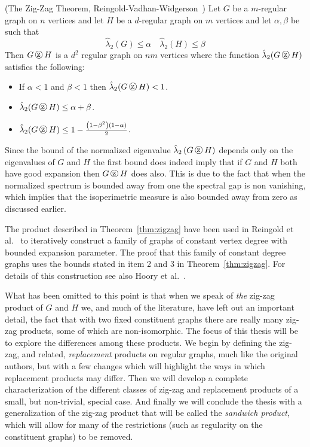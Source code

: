 \begin{theorem}{(The Zig-Zag Theorem, {Reingold-Vadhan-Widgerson}~\cite{Reingold:2002ys})}
\label{thm:zigzag}
\noindent
Let $G$ be a $m$-regular graph on $n$ vertices and let $H$ be a $d$-regular graph on $m$ vertices and let $\alpha, \beta$ be such that \[ \hat{\lambda}_2(G) \leq \alpha \quad \hat{\lambda}_2(H) \leq \beta  \]  Then $G \zigzag H$ is a $d^2$ regular graph on $nm$ vertices where the function $\hat{\lambda}_{2}(G \zigzag H)$ satisfies the following:
\begin{itemize}
\item If $\alpha < 1$  and $\beta < 1$ then $\hat{\lambda}_{2}(G \zigzag H) < 1$.
\item  $\hat{\lambda}_{2}(G \zigzag H) \leq \alpha + \beta$.
\item $\hat{\lambda}_{2}(G \zigzag H) \leq 1 - \frac{\left(1 - \beta^{2} \right)\left(1-\alpha \right)}{2}$.
\end{itemize}
\end{theorem}
\noindent
Since the bound of the normalized eigenvalue $\hat{\lambda}_{2}\left(G \zigzag H\right)$ depends only on the eigenvalues of $G$ and $H$ the first bound does indeed imply that if $G$ and $H$ both have good expansion then $G \zigzag H$ does also. This is due to the fact that when the normalized spectrum is bounded away from one the spectral gap is non vanishing, which implies that the isoperimetric measure is also bounded away from zero as discussed earlier.  

The product described in Theorem~\ref{thm:zigzag} have been used in Reingold {et al.}~\cite{Reingold:2002ys} to iteratively construct a family of graphs of constant vertex degree with bounded expansion parameter. The proof that this family of constant degree graphs uses the bounds stated in item 2 and 3 in Theorem~\ref{thm:zigzag}. For details of this construction see also Hoory {et al.}~\cite{Hoory:2006bh}.

What has been omitted to this point is that when we speak of {\em the} zig-zag product of $G$ and $H$ we, and much of the literature, have left out an important detail, the fact that with two fixed constituent graphs there are really many zig-zag products, some of which are non-isomorphic. The focus of this thesis will be to explore the differences among these products. We begin by defining the zig-zag, and related, {\em replacement} products on regular graphs, much like the original authors, but with a few changes which will highlight the ways in which replacement products may differ. Then we will develop a complete characterization of the different classes of zig-zag and replacement products of a small, but non-trivial, special case. And finally we will conclude the thesis with a generalization of the zig-zag product that will be called the {\em sandwich product}, which will allow for many of the restrictions (such as regularity on the constituent graphs) to be removed.  


